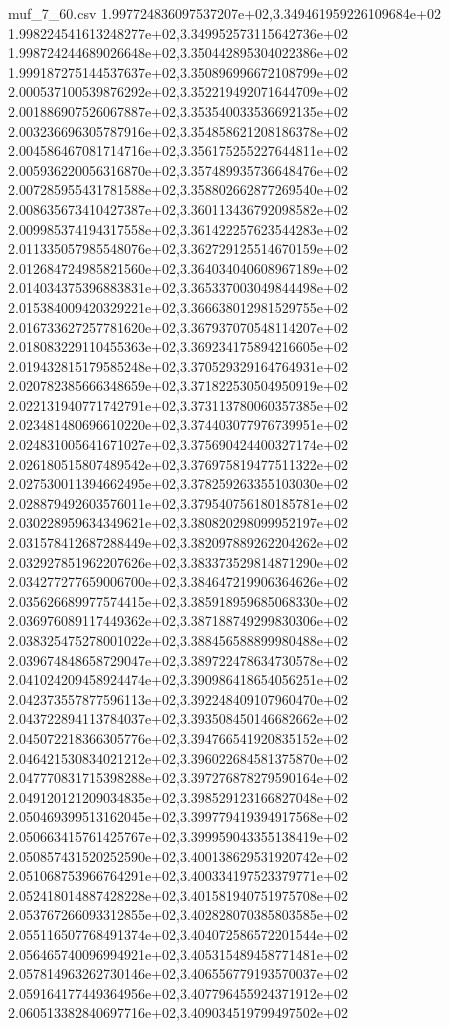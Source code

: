 \begin{filecontents*}{muf_7_60.csv}
1.997724836097537207e+02,3.349461959226109684e+02
1.998224541613248277e+02,3.349952573115642736e+02
1.998724244689026648e+02,3.350442895304022386e+02
1.999187275144537637e+02,3.350896996672108799e+02
2.000537100539876292e+02,3.352219492071644709e+02
2.001886907526067887e+02,3.353540033536692135e+02
2.003236696305787916e+02,3.354858621208186378e+02
2.004586467081714716e+02,3.356175255227644811e+02
2.005936220056316870e+02,3.357489935736648476e+02
2.007285955431781588e+02,3.358802662877269540e+02
2.008635673410427387e+02,3.360113436792098582e+02
2.009985374194317558e+02,3.361422257623544283e+02
2.011335057985548076e+02,3.362729125514670159e+02
2.012684724985821560e+02,3.364034040608967189e+02
2.014034375396883831e+02,3.365337003049844498e+02
2.015384009420329221e+02,3.366638012981529755e+02
2.016733627257781620e+02,3.367937070548114207e+02
2.018083229110455363e+02,3.369234175894216605e+02
2.019432815179585248e+02,3.370529329164764931e+02
2.020782385666348659e+02,3.371822530504950919e+02
2.022131940771742791e+02,3.373113780060357385e+02
2.023481480696610220e+02,3.374403077976739951e+02
2.024831005641671027e+02,3.375690424400327174e+02
2.026180515807489542e+02,3.376975819477511322e+02
2.027530011394662495e+02,3.378259263355103030e+02
2.028879492603576011e+02,3.379540756180185781e+02
2.030228959634349621e+02,3.380820298099952197e+02
2.031578412687288449e+02,3.382097889262204262e+02
2.032927851962207626e+02,3.383373529814871290e+02
2.034277277659006700e+02,3.384647219906364626e+02
2.035626689977574415e+02,3.385918959685068330e+02
2.036976089117449362e+02,3.387188749299830306e+02
2.038325475278001022e+02,3.388456588899980488e+02
2.039674848658729047e+02,3.389722478634730578e+02
2.041024209458924474e+02,3.390986418654056251e+02
2.042373557877596113e+02,3.392248409107960470e+02
2.043722894113784037e+02,3.393508450146682662e+02
2.045072218366305776e+02,3.394766541920835152e+02
2.046421530834021212e+02,3.396022684581375870e+02
2.047770831715398288e+02,3.397276878279590164e+02
2.049120121209034835e+02,3.398529123166827048e+02
2.050469399513162045e+02,3.399779419394917568e+02
2.050663415761425767e+02,3.399959043355138419e+02
2.050857431520252590e+02,3.400138629531920742e+02
2.051068753966764291e+02,3.400334197523379771e+02
2.052418014887428228e+02,3.401581940751975708e+02
2.053767266093312855e+02,3.402828070385803585e+02
2.055116507768491374e+02,3.404072586572201544e+02
2.056465740096994921e+02,3.405315489458771481e+02
2.057814963262730146e+02,3.406556779193570037e+02
2.059164177449364956e+02,3.407796455924371912e+02
2.060513382840697716e+02,3.409034519799497502e+02

\end{filecontents*}
